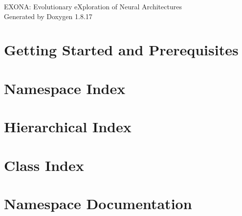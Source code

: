 \let\mypdfximage\pdfximage\def\pdfximage{\immediate\mypdfximage}\documentclass[twoside]{book}
\newcommand{\+}{\discretionary{\mbox{\scriptsize$\hookleftarrow$}}{}{}}
\newcommand{\clearemptydoublepage}{%
  \newpage{\pagestyle{empty}\cleardoublepage}%
}
\begin{document}
\hypersetup{pageanchor=false,
             bookmarksnumbered=true,
             pdfencoding=unicode
            }
\begin{titlepage}
\vspace*{7cm}
\begin{center}%
{\Large E\+X\+O\+NA\+: Evolutionary e\+Xploration of Neural Architectures }\\
\vspace*{1cm}
{\large Generated by Doxygen 1.8.17}\\
\end{center}
\end{titlepage}
\clearemptydoublepage
{}
\tableofcontents
\clearemptydoublepage
{}
\hypersetup{pageanchor=true}

\chapter{Getting Started and Prerequisites}
\label{md__r_e_a_d_m_e}

\chapter{Namespace Index}

\chapter{Hierarchical Index}

\chapter{Class Index}

\chapter{Namespace Documentation}

\end{document}
